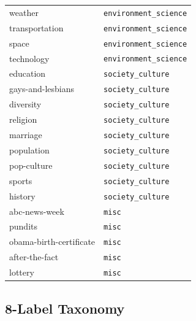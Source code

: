 \begin{longtable}{ll}
weather & \texttt{environment\_science} \\
transportation & \texttt{environment\_science} \\
space & \texttt{environment\_science} \\
technology & \texttt{environment\_science} \\
\midrule
education & \texttt{society\_culture} \\
gays-and-lesbians & \texttt{society\_culture} \\
diversity & \texttt{society\_culture} \\
religion & \texttt{society\_culture} \\
marriage & \texttt{society\_culture} \\
population & \texttt{society\_culture} \\
pop-culture & \texttt{society\_culture} \\
sports & \texttt{society\_culture} \\
history & \texttt{society\_culture} \\
\midrule
abc-news-week & \texttt{misc} \\
pundits & \texttt{misc} \\
obama-birth-certificate & \texttt{misc} \\
after-the-fact & \texttt{misc} \\
lottery & \texttt{misc} \\
\end{longtable}

\subsection{8-Label Taxonomy}
\label{app:domain_mapping_8}

